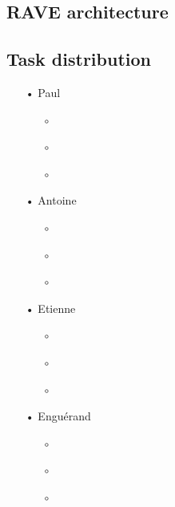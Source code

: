 \documentclass{article}
\begin{document}
\subsection{RAVE architecture}


\subsection{Task distribution}


\begin{itemize}
    \item[•] Paul
    \begin{itemize}
        \item[$\circ$] 
        \item[$\circ$] 
        \item[$\circ$] 
    \end{itemize}
    \item[•] Antoine
    \begin{itemize}
        \item[$\circ$] 
        \item[$\circ$] 
        \item[$\circ$] 
    \end{itemize}
    \item[•] Etienne
    \begin{itemize}
        \item[$\circ$] 
        \item[$\circ$] 
        \item[$\circ$] 
    \end{itemize}
    \item[•] Enguérand
    \begin{itemize}
        \item[$\circ$] 
        \item[$\circ$] 
        \item[$\circ$] 
    \end{itemize}



\end{itemize}

\end{document}
